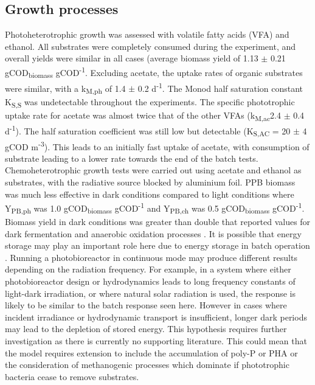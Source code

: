 \subsection{Growth processes}
Photoheterotrophic growth was assessed with volatile fatty acids (VFA) and ethanol. All substrates were completely consumed during the experiment, and overall yields were similar in all cases (average biomass yield of 1.13 $\pm$ 0.21 gCOD\textsubscript{biomass} gCOD\textsuperscript{-1}. Excluding acetate, the uptake rates of organic substrates were similar, with a k\textsubscript{M,ph} of 1.4 $\pm$ 0.2 d\textsuperscript{-1}. The Monod half saturation constant K\textsubscript{S,S} was undetectable throughout the experiments. The specific phototrophic uptake rate for acetate was almost twice that of the other VFAs (k\textsubscript{M,ac}2.4 $\pm$ 0.4 d\textsuperscript{-1}). The half saturation coefficient was still low but detectable (K\textsubscript{S,AC} = 20 $\pm$ 4 gCOD m\textsuperscript{-3}). This leads to an initially fast uptake of acetate, with consumption of substrate leading to a lower rate towards the end of the batch tests. 
\skippingparagraph
Chemoheterotrophic growth tests were carried out using acetate and ethanol as substrates, with the radiative source blocked by aluminium foil. PPB biomass was much less effective in dark conditions compared to light conditions where Y\textsubscript{PB,ph} was 1.0 gCOD\textsubscript{biomass} gCOD\textsuperscript{-1} and Y\textsubscript{PB,ch} was 0.5 gCOD\textsubscript{biomass} gCOD\textsuperscript{-1}. Biomass yield in dark conditions was greater than double that reported values for dark fermentation and anaerobic oxidation processes \cite{Batstone2002}. It is possible that energy storage may play an important role here due to energy storage in batch operation \cite{Liang2010}. Running a photobioreactor in continuous mode may produce different results depending on the radiation frequency. For example, in a system where either photobioreactor design or hydrodynamics leads to long frequency constants of light-dark irradiation, or where natural solar radiation is used, the response is likely to be similar to the batch response seen here. However in cases where incident irradiance or hydrodynamic transport is insufficient, longer dark periods may lead to the depletion of stored energy. This hypothesis requires further investigation as there is currently no supporting literature. This could mean that the model requires extension to include the accumulation of poly-P or PHA or the consideration of methanogenic processes which dominate if phototrophic bacteria cease to remove substrates.
